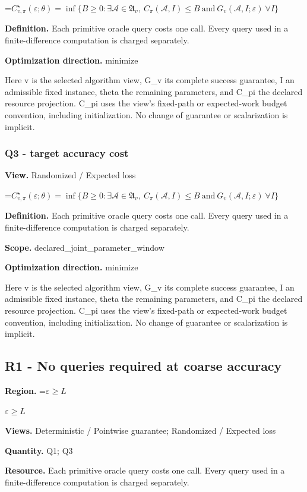 \documentclass[10pt,a4paper]{article}
\newcommand{\AtlasMath}[1]{\par\begingroup\centering\setbox0=\hbox{$\displaystyle #1$}\ifdim\wd0>1.4\linewidth\typeout{ATLAS WIDE FORMULA: \the\wd0}\fi\ifdim\wd0>\linewidth\resizebox{\linewidth}{!}{\box0}\else\box0\fi\par\endgroup}
\newcommand{\AtlasInlineMath}[1]{\begingroup\setbox0=\hbox{$#1$}\ifdim\wd0>.4\linewidth\endgroup\AtlasMath{#1}\else\endgroup$#1$\fi}
\begin{document}
\AtlasMath{C^\star_{v,\pi}(\varepsilon;\theta)=\inf\{B\ge0:\exists\mathcal A\in\mathfrak A_v,\ C_\pi(\mathcal A,I)\le B\ \text{and}\ G_v(\mathcal A,I;\varepsilon)\ \forall I\}}
\textbf{Definition.} Each primitive oracle query costs one call. Every query used in a finite-difference computation is charged separately.

\textbf{Optimization direction.} minimize

Here v is the selected algorithm view, G\_v its complete success guarantee, I an admissible fixed instance, theta the remaining parameters, and C\_pi the declared resource projection. C\_pi uses the view's fixed-path or expected-work budget convention, including initialization. No change of guarantee or scalarization is implicit.

\subsubsection{Q3 - target accuracy cost}
\textbf{View.} Randomized / Expected loss

\AtlasMath{C^\star_{v,\pi}(\varepsilon;\theta)=\inf\{B\ge0:\exists\mathcal A\in\mathfrak A_v,\ C_\pi(\mathcal A,I)\le B\ \text{and}\ G_v(\mathcal A,I;\varepsilon)\ \forall I\}}
\textbf{Definition.} Each primitive oracle query costs one call. Every query used in a finite-difference computation is charged separately.

\textbf{Scope.} declared\_joint\_parameter\_window

\textbf{Optimization direction.} minimize

Here v is the selected algorithm view, G\_v its complete success guarantee, I an admissible fixed instance, theta the remaining parameters, and C\_pi the declared resource projection. C\_pi uses the view's fixed-path or expected-work budget convention, including initialization. No change of guarantee or scalarization is implicit.

\subsection{R1 - No queries required at coarse accuracy}
\textbf{Region.} \AtlasInlineMath{\varepsilon\ge L}

\textbf{Views.} Deterministic / Pointwise guarantee; Randomized / Expected loss

\textbf{Quantity.} Q1; Q3

\textbf{Resource.} Each primitive oracle query costs one call. Every query used in a finite-difference computation is charged separately.
\end{document}
